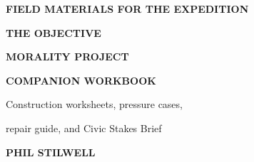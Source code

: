 \frontmatter
\begin{titlepage}
\thispagestyle{empty}
\vspace*{0.10\textheight}
{\sffamily\bfseries\small\color{PaletteRed}\MakeUppercase{Field materials for the expedition}\par}
\vspace{0.9em}
{\sffamily\bfseries\fontsize{34}{37}\selectfont\color{PaletteInk} THE OBJECTIVE\par}
{\sffamily\bfseries\fontsize{34}{37}\selectfont\color{PaletteInk} MORALITY PROJECT\par}
\vspace{1.1em}
\chapterornament
\vspace{1.3em}
{\sffamily\bfseries\LARGE\color{PaletteOlive} COMPANION WORKBOOK\par}
\vspace{0.85em}
{\displayfont\Large\color{PaletteGraphite} Construction worksheets, pressure cases,\par}
{\displayfont\Large\color{PaletteGraphite} repair guide, and Civic Stakes Brief\par}
\vfill
\noindent\colorbox{PaletteInk}{%
  \parbox{\dimexpr\textwidth-2\fboxsep\relax}{%
    \vspace{0.7em}\centering\sffamily\bfseries\large\color{PalettePaper} PHIL STILWELL\par\vspace{0.7em}%
  }%
}
\vspace*{0.07\textheight}
\end{titlepage}
